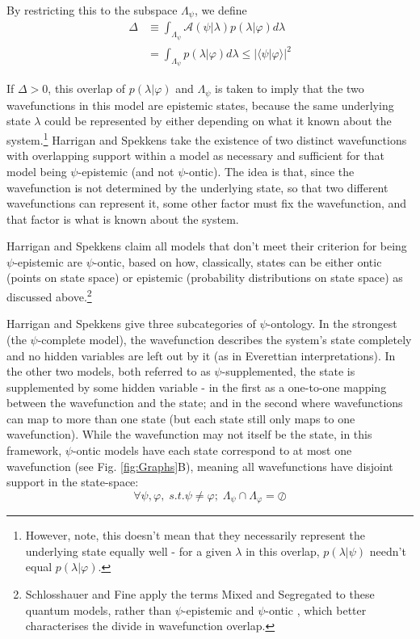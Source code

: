 \documentclass[superscriptaddress,reprint, floatfix, prl,nofootinbib]{revtex4-2}
\newcommand{\braket}[2]{\langle #1|#2 \rangle}
\begin{document}
By restricting this to the subspace $\Lambda_\psi$, we define
\begin{equation}
\begin{split}
\Delta&\equiv\int_{\Lambda_\psi}\mathcal{A}(\psi\vert\lambda) p(\lambda\vert\varphi) d\lambda\\
    &=\int_{\Lambda_\psi} p(\lambda\vert\varphi) d\lambda\leq\vert\braket{\psi}{\varphi}\vert^2
    \end{split}
\end{equation}

If $\Delta>0$, this overlap of $p(\lambda\vert\varphi)$ and $\Lambda_\psi$ is taken to imply that the two wavefunctions in this model are epistemic states, because the same underlying state $\lambda$ could be represented by either depending on what it known about the system.\footnote{However, note, this doesn't mean that they necessarily represent the underlying state equally well - for a given $\lambda$ in this overlap, $p(\lambda\vert\psi)$ needn't equal $p(\lambda\vert\varphi)$.} Harrigan and Spekkens take the existence of two distinct wavefunctions with overlapping support within a model as necessary and sufficient for that model being $\psi$-epistemic (and not $\psi$-ontic). The idea is that, since the wavefunction is not determined by the underlying state, so that two different wavefunctions can represent it, some other factor must fix the wavefunction, and that factor is what is known about the system.

Harrigan and Spekkens claim all models that don't meet their criterion for being $\psi$-epistemic are $\psi$-ontic, based on how, classically, states can be either ontic (points on state space) or epistemic (probability distributions on state space) as discussed above.\footnote{Schlosshauer and Fine apply the terms Mixed and Segregated to these quantum models, rather than $\psi$-epistemic and $\psi$-ontic \cite{Schlosshauer2012Implications}, which better characterises the divide in wavefunction overlap.}

Harrigan and Spekkens give three subcategories of $\psi$-ontology. In the strongest (the $\psi$-complete model), the wavefunction describes the system's state completely and no hidden variables are left out by it (as in Everettian interpretations). In the other two models, both referred to as $\psi$-supplemented, the state is supplemented by some hidden variable - in the first as a one-to-one mapping between the wavefunction and the state; and in the second where wavefunctions can map to more than one state (but each state still only maps to one wavefunction). While the wavefunction may not itself be the state, in this framework, $\psi$-ontic models have each state correspond to at most one wavefunction (see Fig. \ref{fig:Graphs}B), meaning all wavefunctions have disjoint support in the state-space:
\begin{equation}
    \forall\psi,\varphi,\;s.t.\psi\neq\varphi;\;\Lambda_{\psi}\cap\Lambda_{\varphi}=\oslash
\end{equation}
\end{document}
